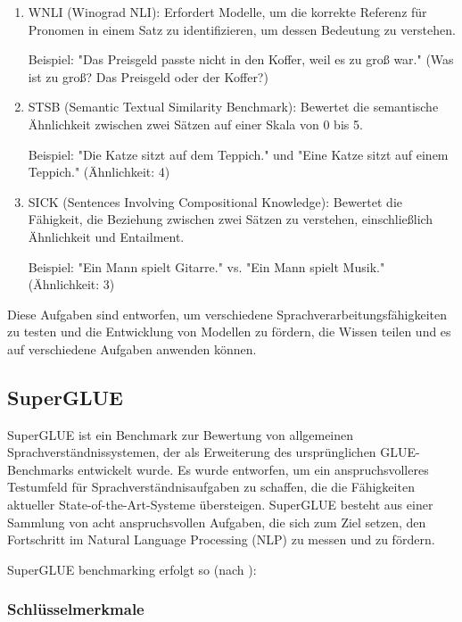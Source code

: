 \begin{enumerate}
\item WNLI (Winograd NLI): Erfordert Modelle, um die korrekte Referenz für Pronomen in einem Satz zu identifizieren, um dessen Bedeutung zu verstehen.

Beispiel: "Das Preisgeld passte nicht in den Koffer, weil es zu groß war." (Was ist zu groß? Das Preisgeld oder der Koffer?)

\item STSB (Semantic Textual Similarity Benchmark): Bewertet die semantische Ähnlichkeit zwischen zwei Sätzen auf einer Skala von 0 bis 5.

Beispiel: "Die Katze sitzt auf dem Teppich." und "Eine Katze sitzt auf einem Teppich." (Ähnlichkeit: 4)

\item SICK (Sentences Involving Compositional Knowledge): Bewertet die Fähigkeit, die Beziehung zwischen zwei Sätzen zu verstehen, einschließlich Ähnlichkeit und Entailment.

Beispiel: "Ein Mann spielt Gitarre." vs. "Ein Mann spielt Musik." (Ähnlichkeit: 3)
\end{enumerate}

Diese Aufgaben sind entworfen, um verschiedene Sprachverarbeitungsfähigkeiten zu testen und die Entwicklung von Modellen zu fördern, die Wissen teilen und es auf verschiedene Aufgaben anwenden können.

\subsection{SuperGLUE}

SuperGLUE ist ein Benchmark zur Bewertung von allgemeinen Sprachverständnissystemen, der als Erweiterung des ursprünglichen GLUE-Benchmarks entwickelt wurde. Es wurde entworfen, um ein anspruchsvolleres Testumfeld für Sprachverständnisaufgaben zu schaffen, die die Fähigkeiten aktueller State-of-the-Art-Systeme übersteigen. SuperGLUE besteht aus einer Sammlung von acht anspruchsvollen Aufgaben, die sich zum Ziel setzen, den Fortschritt im Natural Language Processing (NLP) zu messen und zu fördern.

SuperGLUE benchmarking erfolgt so (nach \cite{wang_superglue:_2020}):

\subsubsection*{Schlüsselmerkmale}


